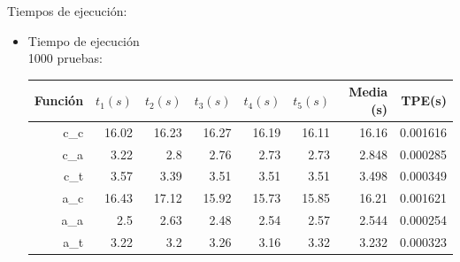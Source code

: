 \documentclass[12pt,letterpaper]{article}
\begin{document}
Tiempos de ejecuci\'on:
\begin{itemize}
\item {\large Tiempo de ejecuci\'on}\\
  1000 pruebas:
  \begin{center}
    \begin{tabular}{ r | r | r | r | r | r | r | r }
      Funci\'on & $t_1 (s)$ & $t_2 (s)$ & $t_3 (s)$ & $t_4 (s)$ & $t_5 (s)$ & Media (s) & TPE\footnotemark[1] (s) \\ \hline
      c\_c    & 16.02 & 16.23 & 16.27 & 16.19 & 16.11 & 16.16 & 0.001616 \\
      c\_a    & 3.22  & 2.8   & 2.76  & 2.73  & 2.73  & 2.848 & 0.000285 \\
      c\_t    & 3.57  & 3.39  & 3.51  & 3.51  & 3.51  & 3.498 & 0.000349 \\ \hline
      a\_c    & 16.43 & 17.12 & 15.92 & 15.73 & 15.85 & 16.21 & 0.001621 \\
      a\_a    & 2.5   & 2.63  & 2.48  & 2.54  & 2.57  & 2.544 & 0.000254 \\
      a\_t    & 3.22  & 3.2   & 3.26  & 3.16  & 3.32  & 3.232 & 0.000323 \\ \hline
    \end{tabular}
  \end{center}


\end{itemize}
\end{document}
